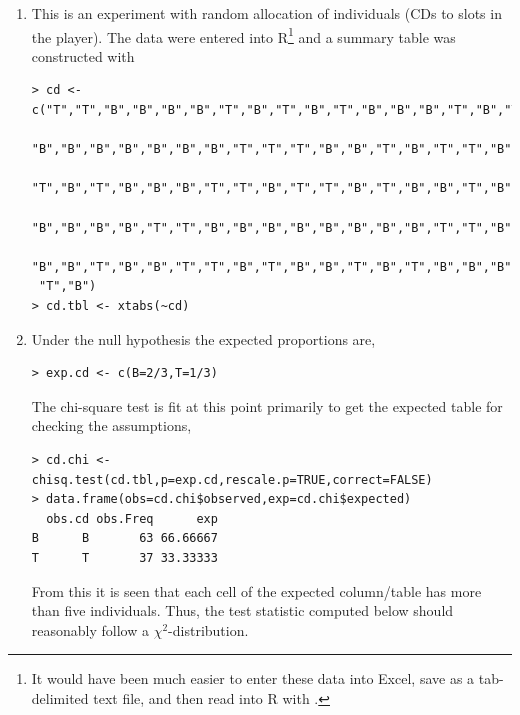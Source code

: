 \documentclass[10pt,openany]{book}\usepackage[]{graphicx}\usepackage[]{color}
\makeatletter
\newenvironment{kframe}{%
 \def\at@end@of@kframe{}%
 \ifinner\ifhmode%
  \def\at@end@of@kframe{\end{minipage}}%
  \begin{minipage}{\columnwidth}%
 \fi\fi%
 \def\FrameCommand##1{\hskip\@totalleftmargin \hskip-\fboxsep
 \colorbox{shadecolor}{##1}\hskip-\fboxsep
     \hskip-\linewidth \hskip-\@totalleftmargin \hskip\columnwidth}%
 \MakeFramed {\advance\hsize-\width
   \@totalleftmargin\z@ \linewidth\hsize
   \@setminipage}}%
 {\par\unskip\endMakeFramed%
 \at@end@of@kframe}
\newenvironment{knitrout}{}{} %
\makeatother
\begin{document}
\begin{itemize}
\begin{enumerate}
      \item This is an experiment with random allocation of individuals (CDs to slots in the player).  The data were entered into R\footnote{It would have been much easier to enter these data into Excel, save as a tab-delimited text file, and then read into R with .} and a summary table was constructed with
\begin{knitrout}
\color{fgcolor}\begin{kframe}
\begin{verbatim}
> cd <- c("T","T","B","B","B","B","T","B","T","B","T","B","B","B","T","B","T","B",
 "B","B","B","B","B","B","B","T","T","T","B","B","T","B","T","T","B","T","B","B",
 "T","B","T","B","B","B","T","T","B","T","T","B","T","B","B","T","B","B","B","T",
 "B","B","B","B","T","T","B","B","B","B","B","B","B","B","T","T","B","B","T","T",
 "B","B","T","B","B","T","T","B","T","B","B","T","B","T","B","B","B","B","T","B",
 "T","B")
> cd.tbl <- xtabs(~cd)
\end{verbatim}
\end{kframe}
\end{knitrout}
      \item Under the null hypothesis the expected proportions are,
\begin{knitrout}
\color{fgcolor}\begin{kframe}
\begin{verbatim}
> exp.cd <- c(B=2/3,T=1/3)
\end{verbatim}
\end{kframe}
\end{knitrout}
The chi-square test is fit at this point primarily to get the expected table for checking the assumptions,
\begin{knitrout}
\color{fgcolor}\begin{kframe}
\begin{verbatim}
> cd.chi <- chisq.test(cd.tbl,p=exp.cd,rescale.p=TRUE,correct=FALSE)
> data.frame(obs=cd.chi$observed,exp=cd.chi$expected)
  obs.cd obs.Freq      exp
B      B       63 66.66667
T      T       37 33.33333
\end{verbatim}
\end{kframe}
\end{knitrout}
From this it is seen that each cell of the expected column/table has more than five individuals.  Thus, the test statistic computed below should reasonably follow a $\chi^{2}$-distribution.

\end{enumerate}
\end{itemize}
\end{document}
